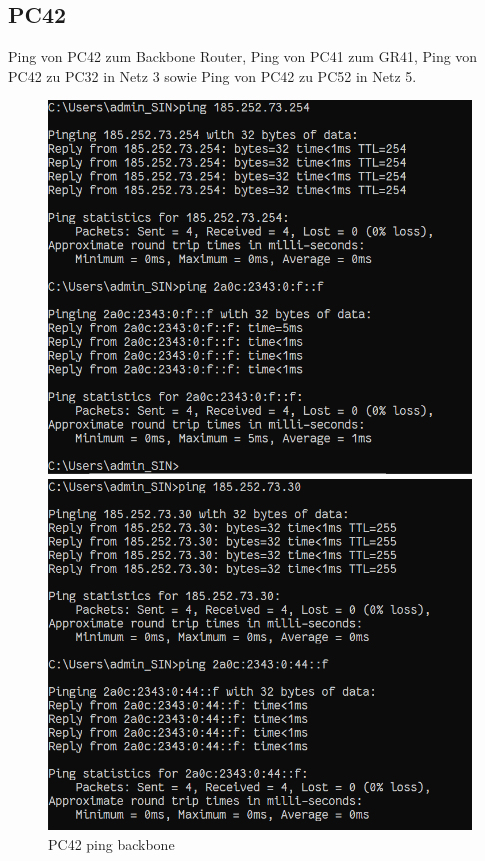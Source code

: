 \documentclass{article}
\begin{document}
\subsection{PC42}
Ping von PC42 zum Backbone Router, Ping von PC41 zum GR41, Ping von PC42 zu PC32 in Netz 3 sowie Ping von PC42 zu PC52 in Netz 5.\\
\begin{figure}[!htp]
  \centering
  \begin{minipage}[b]{0.2\textwidth}
    \includegraphics[width=\textwidth]{Arbeitsergebnisse/PC42/pc42_ping_backbone.png}
    \caption{PC42 ping backbone}
  \end{minipage}
  \hspace{0.8cm}
  \begin{minipage}[b]{0.2\textwidth}
    \includegraphics[width=\textwidth]{Arbeitsergebnisse/PC42/pc42_ping_gr41.png}

\end{minipage}
\end{figure}
\end{document}
